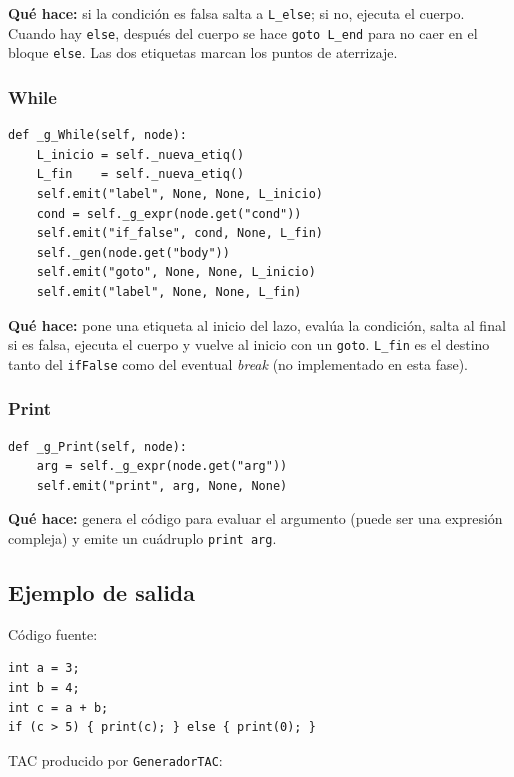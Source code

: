 \documentclass[11pt,a4paper]{article}
\begin{document}
\textbf{Qué hace:} si la condición es falsa salta a \texttt{L\_else};
si no, ejecuta el cuerpo. Cuando hay \texttt{else}, después del cuerpo se
hace \texttt{goto L\_end} para no caer en el bloque \texttt{else}.
Las dos etiquetas marcan los puntos de aterrizaje.

\subsubsection{While}

\begin{lstlisting}[style=py]
def _g_While(self, node):
    L_inicio = self._nueva_etiq()
    L_fin    = self._nueva_etiq()
    self.emit("label", None, None, L_inicio)
    cond = self._g_expr(node.get("cond"))
    self.emit("if_false", cond, None, L_fin)
    self._gen(node.get("body"))
    self.emit("goto", None, None, L_inicio)
    self.emit("label", None, None, L_fin)
\end{lstlisting}

\textbf{Qué hace:} pone una etiqueta al inicio del lazo, evalúa la condición,
salta al final si es falsa, ejecuta el cuerpo y vuelve al inicio con un
\texttt{goto}. \texttt{L\_fin} es el destino tanto del \texttt{ifFalse}
como del eventual \textit{break} (no implementado en esta fase).

\subsubsection{Print}

\begin{lstlisting}[style=py]
def _g_Print(self, node):
    arg = self._g_expr(node.get("arg"))
    self.emit("print", arg, None, None)
\end{lstlisting}

\textbf{Qué hace:} genera el código para evaluar el argumento (puede ser
una expresión compleja) y emite un cuádruplo \texttt{print arg}.

\subsection{Ejemplo de salida}

Código fuente:

\begin{lstlisting}[style=tac]
int a = 3;
int b = 4;
int c = a + b;
if (c > 5) { print(c); } else { print(0); }
\end{lstlisting}

TAC producido por \texttt{GeneradorTAC}:
\end{document}
